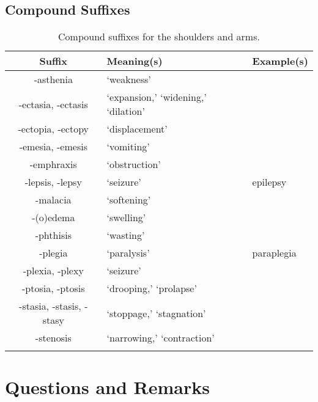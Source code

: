 \subsection{Compound Suffixes}


\begin{longtable}{c | p{} | p{}}
    \caption{Compound suffixes for the shoulders and arms.}
    \hline
    Suffix & Meaning(s) & Example(s) \\ \hline
        -asthenia & `weakness' & \\
        -ectasia, -ectasis & `expansion,' `widening,' `dilation' & \\
        -ectopia, -ectopy & `displacement' & \\
        -emesia, -emesis & `vomiting' & \\
        -emphraxis & `obstruction' & \\
        -lepsis, -lepsy & `seizure' & epilepsy \\
        -malacia & `softening' & \\
        -(o)edema & `swelling' & \\
        -phthisis & `wasting' & \\
        -plegia & `paralysis' & paraplegia \\
        -plexia, -plexy & `seizure' & \\
        -ptosia, -ptosis & `drooping,' `prolapse' & \\
        -stasia, -stasis, -stasy & `stoppage,' `stagnation' & \\
        -stenosis & `narrowing,' `contraction' & \\
    \label{tab:Ch10Suffix}
\end{longtable}

\section{Questions and Remarks}
\label{sec:QR10}






%
%
%


